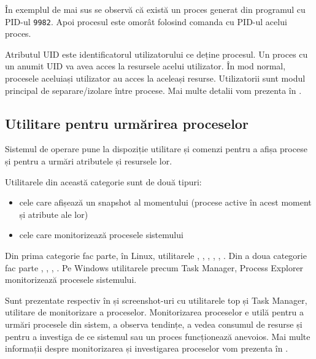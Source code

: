 
În exemplul de mai sus se observă că există un proces generat din programul  cu PID-ul \texttt{9982}. Apoi procesul este omorât folosind comanda  cu PID-ul acelui proces.

Atributul UID  este identificatorul utilizatorului ce
deține procesul. Un proces cu un anumit UID va avea acces la resursele acelui
utilizator. În mod normal, procesele aceluiași utilizator au acces la aceleași
resurse. Utilizatorii sunt modul principal de separare/izolare între procese.
Mai multe detalii vom prezenta în .

\subsection{Utilitare pentru urmărirea proceselor}
\label{sec:procese-resurse-monitorizare}

Sistemul de operare pune la dispoziție utilitare și comenzi pentru a afișa
procese și pentru a urmări atributele și resursele lor.

Utilitarele din această categorie sunt de două tipuri:

\begin{itemize}
	\item cele care afișează un snapshot al momentului (procese active în
		acest moment și atribute ale lor)
	\item cele care monitorizează procesele sistemului
\end{itemize}

Din prima categorie fac parte, în Linux, utilitarele , , , ,
, . Din a doua categorie fac parte , , , . Pe Windows
utilitarele precum Task Manager, Process Explorer monitorizează procesele
sistemului.

Sunt prezentate respectiv în  și  screenshot-uri cu utilitarele top și Task Manager, utilitare de monitorizare a proceselor. Monitorizarea
proceselor e utilă pentru a urmări procesele din sistem, a observa tendințe, a
vedea consumul de resurse și pentru a investiga de ce sistemul sau un proces
funcționează anevoios. Mai multe informații despre monitorizarea și investigarea
proceselor vom prezenta în .

